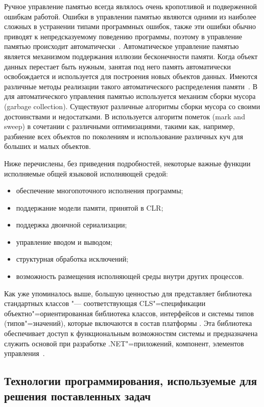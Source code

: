 Ручное управление памятью всегда являлось очень кропотливой и подверженной ошибкам работой.
Ошибки в управлении памятью являются одними из наиболее сложных в устранении типами программных ошибок, также эти ошибки обычно приводят к непредсказуемому поведению программы, поэтому в \dotnet{} управление памятью происходит автоматически~\cite[с.~505\,--\,506]{richter_2012_en}.
Автоматическое управление памятью является механизмом поддержания иллюзии бесконечности памяти.
Когда объект данных перестает быть нужным, занятая под него память автоматически освобождается и используется для построения новых объектов данных.
Имеются различные методы реализации такого автоматического распределения памяти~\cite[с.~489]{sicp_2006_ru}.
В~\dotnet{} для автоматического управления памятью используется механизм сборки мусора (garbage collection).
Существуют различные алгоритмы сборки мусора со своими достоинствами и недостатками. 
В \dotnet{} используется алгоритм пометок (mark and sweep) в сочетании с различными оптимизациями, такими как, например, разбиение всех объектов по поколениям и использование различных куч для больших и малых объектов.

Ниже перечислены, без приведения подробностей, некоторые важные функции исполняемые общей языковой исполняющей средой:
\begin{itemize}
  \item обеспечение многопоточного исполнения программы;
  \item поддержание модели памяти, принятой в CLR;
  \item поддержка двоичной сериализации;
  \item управление вводом и выводом;
  \item структурная обработка исключений;
  \item возможность размещения исполняющей среды внутри других процессов.
\end{itemize}

Как уже упоминалось выше, большую ценностью для \dotnet{} представляет библиотека стандартных классов "--- соответствующая CLS"=спецификации объектно"=ориентированная библиотека классов, интерфейсов и системы типов (типов"=значений), которые включаются в состав платформы \dotnet{}.
Эта библиотека обеспечивает доступ к функциональным возможностям системы и предназначена служить основой при разработке .NET"=приложений, компонент, элементов управления~\cite{marchenko_2007}.



\subsection{Технологии программирования, используемые для решения поставленных задач}
\label{sub:theory_and_motivation:tools}


